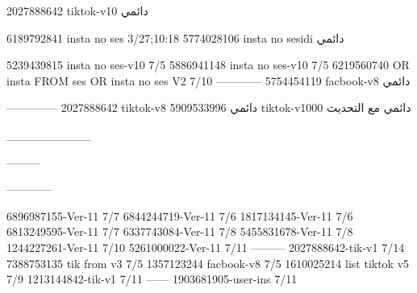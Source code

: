 2027888642 tiktok-v10
دائمي

6189792841 insta no ses
3/27;10:18
5774028106 insta no sesidi
دائمي

5239439815 insta no ses-v10
7/5
5886941148 insta no ses-v10
7/5
6219560740 OR insta FROM ses OR insta no ses V2
7/10
------------
5754454119 facbook-v8
دائمي


--------------
2027888642 tiktok-v8
دائمي
5909533996 tiktok-v1000
دائمي مع التحديث

__________

---------

------------

6896987155-Ver-11
7/7
6844244719-Ver-11
7/6
1817134145-Ver-11
7/6
6813249595-Ver-11
7/7
6337743084-Ver-11
7/8
5455831678-Ver-11
7/8
1244227261-Ver-11
7/10
5261000022-Ver-11
7/11
---------
2027888642-tik-v1
7/14
7388753135 tik from v3
7/5
1357123244 facbook-v8
7/5
1610025214 list tiktok v5
7/9
1213144842-tik-v1
7/11
------
1903681905-user-ins
7/11
